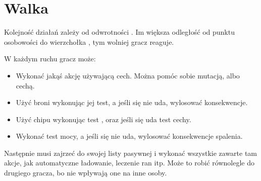 \chapter{Walka}
Kolejność działań zależy od odwrotności \abp{}.
Im większa odległość od punktu osobowości do wierzchołka \abp{}, tym wolniej gracz reaguje.

W każdym ruchu gracz może:
\begin{itemize}
\item Wykonać jakąś akcję używającą cech. Można pomóc sobie mutacją, albo cechą.
\item Użyć broni wykonując jej test, a jeśli się nie uda, wylosować konsekwencje.
\item Użyć chipu wykonując test \abnkp{}, oraz jeśli się uda test cechy.
\item Wykonać test mocy, a jeśli się nie uda, wylosować konsekwencje spalenia.
\end{itemize}

Następnie musi zajrzeć do swojej listy pasywnej i wykonać wszystkie zawarte tam akcje, jak automatyczne ładowanie, leczenie ran itp.
Może to robić równolegle do drugiego gracza, bo nie wpływają one na inne osoby.


